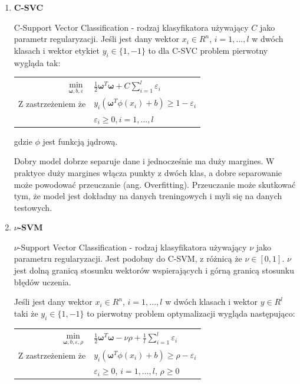 \documentclass[paper=a4, fontsize=11pt]{scrartcl} %
\numberwithin{equation}{section} %
\numberwithin{figure}{section} %
\begin{document}
\begin{enumerate}
    \item \textbf{C-SVC}
    \par C-Support Vector Classification - rodzaj klasyfikatora używający $C$ jako 
    parametr regularyzacji. Jeśli jest dany wektor $x_i \in R^n$, $i=1,...,l$ 
    w dwóch klasach i wektor etykiet $y_i \in \{1, -1\}$ to dla C-SVC problem pierwotny wygląda
    tak:

    \begin{center}
        \begin{tabular}{rl}
            $\min\limits_{\pmb{\omega}, b, \varepsilon}$ & $\frac{1}{2} \pmb{\omega} ^T \pmb{\omega} +
            C \sum\limits_{i=1}^{l}\varepsilon_i$ \\
            Z zastrzeżeniem że & $y_i(\pmb{\omega}^T\phi(x_i) + b) \geq 1 - \varepsilon_i$ \\
                               & $\varepsilon_i \geq 0,i=1,...,l$
        \end{tabular}
    \end{center}

    gdzie $\phi$ jest funkcją jądrową.

    \par Dobry model dobrze separuje dane i jednocześnie ma duży margines. W praktyce
    duży margines włącza punkty z dwóch klas, a
    dobre separowanie może powodować przeuczanie (ang. Overfitting). Przeuczanie może 
    skutkować tym, że model jest dokładny na danych treningowych i myli się na danych testowych.

\item \textbf{$\nu$-SVM}
    \par $\nu$-Support Vector Classification - rodzaj klasyfikatora używający $\nu$ jako
    parametru regularyzacji. Jest podobny do C-SVM, z różnicą że $\nu\in[0,1]$.
    $\nu$ jest dolną granicą stosunku wektorów wspierających i górną granicą stosunku błędów uczenia.
    \par Jeśli jest dany wektor $x_i \in R^n$, $i=1,...,l$ w dwóch klasach i wektor
    $y\in R^l$ taki że $y_i \in \{1, -1\}$ to pierwotny problem optymalizacji wygląda
    następująco:

    \begin{center}
        \begin{tabular}{rl}
            $\min\limits_{\pmb{\omega},b,\varepsilon, \rho}$ &
            $\frac{1}{2}\pmb{\omega}^T\pmb{\omega} - \nu\rho + \frac{1}{l}\sum\limits_{i=1}^{l}
            \varepsilon_i$ \\
            Z zastrzeżeniem że & $y_i(\pmb{\omega}^T\phi(x_i) + b) \geq \rho - \varepsilon_i$ \\
                               & $\varepsilon_i \geq 0$, $i=1,...,l$, $\rho \geq 0$
        \end{tabular}
    \end{center}


\end{enumerate}
\end{document}

